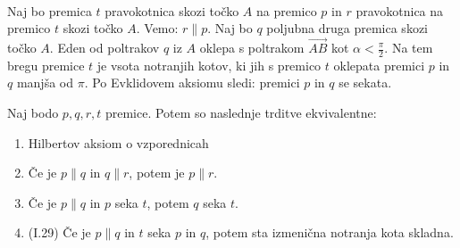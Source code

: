 \begin{dokaz}
            \\ Naj bo premica $t$ pravokotnica skozi točko $A$ na premico $p$ in $r$ pravokotnica na premico $t$ skozi točko $A$. Vemo: $r \parallel p$. Naj bo $q$ poljubna druga premica skozi točko $A$. Eden od poltrakov $q$ iz $A$ oklepa s poltrakom $\overrightarrow{AB}$ kot $\alpha<\frac{\pi}{2}$. Na tem bregu premice $t$ je vsota notranjih kotov, ki jih s premico $t$ oklepata premici $p$ in $q$ manjša od $\pi$. Po Evklidovem aksiomu sledi: premici $p$ in $q$ se sekata.
        \end{dokaz}

    \begin{izrek}
        Naj bodo $p, q, r, t$ premice. Potem so naslednje trditve ekvivalentne:
        \begin{enumerate}
            \item Hilbertov aksiom o vzporednicah
            \item Če je $p\parallel q$ in $q \parallel r$, potem je $p\parallel r$.
            \item Če je $p\parallel q$ in $p$ seka $t$, potem $q$ seka $t$.
            \item (I.29) Če je $p\parallel q$ in $t$ seka $p$ in $q$, potem sta izmenična notranja kota skladna.
        \end{enumerate}
    \end{izrek}

